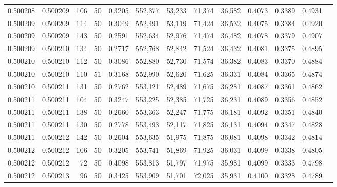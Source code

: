 \begin{tabular}{rrrrrrrrrrrrr}
0.500208 & 0.500209 &   106 &  50 &                                     0.3205 & 552,377 &  53,233 &  71,374 &  36,582 & 0.4073 & 0.3389 & 0.4931 \\
0.500209 & 0.500209 &   114 &  50 &                                     0.3049 & 552,491 &  53,119 &  71,424 &  36,532 & 0.4075 & 0.3384 & 0.4920 \\
0.500209 & 0.500209 &   143 &  50 &                                     0.2591 & 552,634 &  52,976 &  71,474 &  36,482 & 0.4078 & 0.3379 & 0.4907 \\
0.500209 & 0.500210 &   134 &  50 &                                     0.2717 & 552,768 &  52,842 &  71,524 &  36,432 & 0.4081 & 0.3375 & 0.4895 \\
0.500210 & 0.500210 &   112 &  50 &                                     0.3086 & 552,880 &  52,730 &  71,574 &  36,382 & 0.4083 & 0.3370 & 0.4884 \\
0.500210 & 0.500210 &   110 &  51 &                                     0.3168 & 552,990 &  52,620 &  71,625 &  36,331 & 0.4084 & 0.3365 & 0.4874 \\
0.500210 & 0.500211 &   131 &  50 &                                     0.2762 & 553,121 &  52,489 &  71,675 &  36,281 & 0.4087 & 0.3361 & 0.4862 \\
0.500211 & 0.500211 &   104 &  50 &                                     0.3247 & 553,225 &  52,385 &  71,725 &  36,231 & 0.4089 & 0.3356 & 0.4852 \\
0.500211 & 0.500211 &   138 &  50 &                                     0.2660 & 553,363 &  52,247 &  71,775 &  36,181 & 0.4092 & 0.3351 & 0.4840 \\
0.500211 & 0.500211 &   130 &  50 &                                     0.2778 & 553,493 &  52,117 &  71,825 &  36,131 & 0.4094 & 0.3347 & 0.4828 \\
0.500211 & 0.500212 &   142 &  50 &                                     0.2604 & 553,635 &  51,975 &  71,875 &  36,081 & 0.4098 & 0.3342 & 0.4814 \\
0.500212 & 0.500212 &   106 &  50 &                                     0.3205 & 553,741 &  51,869 &  71,925 &  36,031 & 0.4099 & 0.3338 & 0.4805 \\
0.500212 & 0.500212 &    72 &  50 &                                     0.4098 & 553,813 &  51,797 &  71,975 &  35,981 & 0.4099 & 0.3333 & 0.4798 \\
0.500212 & 0.500213 &    96 &  50 &                                     0.3425 & 553,909 &  51,701 &  72,025 &  35,931 & 0.4100 & 0.3328 & 0.4789 \\

\end{tabular}
